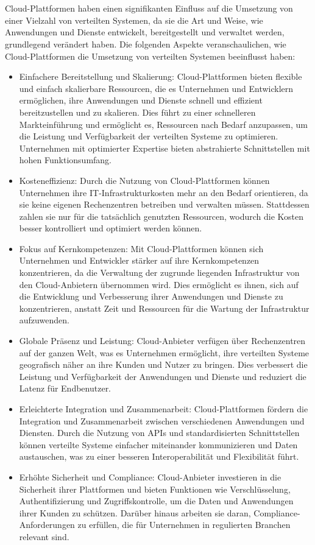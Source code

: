 \documentclass[../vs-script-first-v01.tex]{subfiles}
\begin{document}
\\\\
Cloud-Plattformen haben einen signifikanten Einfluss auf die Umsetzung von einer Vielzahl von verteilten Systemen, da sie die Art und Weise, wie Anwendungen und Dienste entwickelt, bereitgestellt und verwaltet werden, grundlegend verändert haben. Die folgenden Aspekte veranschaulichen, wie Cloud-Plattformen die Umsetzung von verteilten Systemen beeinflusst haben:
\begin{itemize}
\item Einfachere Bereitstellung und Skalierung: Cloud-Plattformen bieten flexible und einfach skalierbare Ressourcen, die es Unternehmen und Entwicklern ermöglichen, ihre Anwendungen und Dienste schnell und effizient bereitzustellen und zu skalieren. Dies führt zu einer schnelleren Markteinführung und ermöglicht es, Ressourcen nach Bedarf anzupassen, um die Leistung und Verfügbarkeit der verteilten Systeme zu optimieren. Unternehmen mit optimierter Expertise bieten abstrahierte Schnittstellen mit hohen Funktionsumfang. 
\item Kosteneffizienz: Durch die Nutzung von Cloud-Plattformen können Unternehmen ihre IT-Infrastrukturkosten mehr an den Bedarf orientieren, da sie keine eigenen Rechenzentren betreiben und verwalten müssen. Stattdessen zahlen sie nur für die tatsächlich genutzten Ressourcen, wodurch die Kosten besser kontrolliert und optimiert werden können.
\item Fokus auf Kernkompetenzen: Mit Cloud-Plattformen können sich Unternehmen und Entwickler stärker auf ihre Kernkompetenzen konzentrieren, da die Verwaltung der zugrunde liegenden Infrastruktur von den Cloud-Anbietern übernommen wird. Dies ermöglicht es ihnen, sich auf die Entwicklung und Verbesserung ihrer Anwendungen und Dienste zu konzentrieren, anstatt Zeit und Ressourcen für die Wartung der Infrastruktur aufzuwenden.
\item Globale Präsenz und Leistung: Cloud-Anbieter verfügen über Rechenzentren auf der ganzen Welt, was es Unternehmen ermöglicht, ihre verteilten Systeme geografisch näher an ihre Kunden und Nutzer zu bringen. Dies verbessert die Leistung und Verfügbarkeit der Anwendungen und Dienste und reduziert die Latenz für Endbenutzer.
\item Erleichterte Integration und Zusammenarbeit: Cloud-Plattformen fördern die Integration und Zusammenarbeit zwischen verschiedenen Anwendungen und Diensten. Durch die Nutzung von APIs und standardisierten Schnittstellen können verteilte Systeme einfacher miteinander kommunizieren und Daten austauschen, was zu einer besseren Interoperabilität und Flexibilität führt.
\item Erhöhte Sicherheit und Compliance: Cloud-Anbieter investieren in die Sicherheit ihrer Plattformen und bieten Funktionen wie Verschlüsselung, Authentifizierung und Zugriffskontrolle, um die Daten und Anwendungen ihrer Kunden zu schützen. Darüber hinaus arbeiten sie daran, Compliance-Anforderungen zu erfüllen, die für Unternehmen in regulierten Branchen relevant sind.
\end{itemize}
\end{document}
